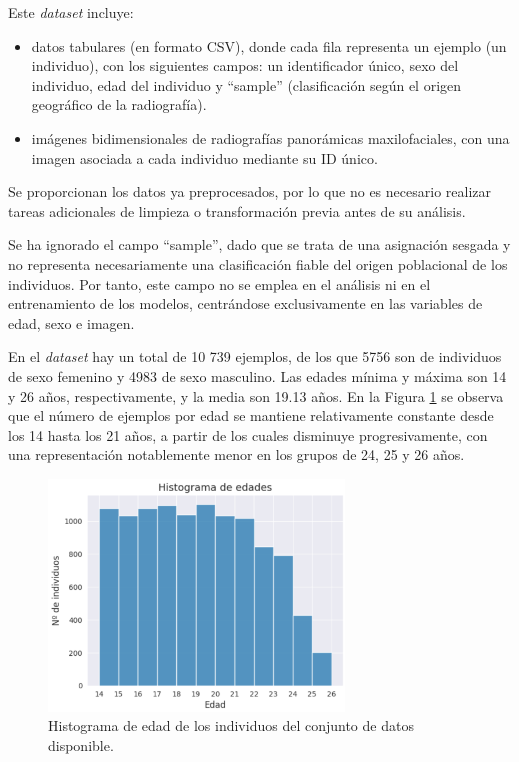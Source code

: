 Este \textit{dataset} incluye:

\begin{itemize}

    \item datos tabulares (en formato CSV), donde cada fila representa un ejemplo (un individuo), con los siguientes campos: un identificador único, sexo del individuo, edad del individuo y ``sample'' (clasificación según el origen geográfico de la radiografía).

    \item imágenes bidimensionales de radiografías panorámicas maxilofaciales, con una imagen asociada a cada individuo mediante su ID único. 

\end{itemize}

Se proporcionan los datos ya preprocesados, por lo que no es necesario realizar tareas adicionales de limpieza o transformación previa antes de su análisis.

Se ha ignorado el campo ``sample'', dado que se trata de una asignación sesgada y no representa necesariamente una clasificación fiable del origen poblacional de los individuos. Por tanto, este campo no se emplea en el análisis ni en el entrenamiento de los modelos, centrándose exclusivamente en las variables de edad, sexo e imagen.

En el \textit{dataset} hay un total de 10 739 ejemplos, de los que 5756 son de individuos de sexo femenino y 4983 de sexo masculino. Las edades mínima y máxima son 14 y 26 años, respectivamente, y la media son 19.13 años. En la Figura \ref{fig:histogram_ages} se observa que el número de ejemplos por edad se mantiene relativamente constante desde los 14 hasta los 21 años, a partir de los cuales disminuye progresivamente, con una representación notablemente menor en los grupos de 24, 25 y 26 años.
 
\begin{figure}[h]
    \centering
    \includegraphics[width=0.7\textwidth]{capitulos/cap_04/imagenes/histogram_ages.png}
    \caption[
        Histograma de edad de los individuos del conjunto de datos disponible.
    ]{
        Histograma de edad de los individuos del conjunto de datos disponible. 
    } 
    \label{fig:histogram_ages}
\end{figure}

